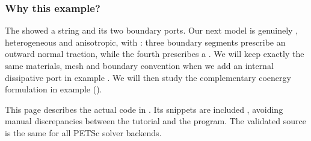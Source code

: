 \documentclass[letterpaper,10pt,english]{sphinxmanual}
\begin{document}
\subsubsection{Why this example?}
\label{\detokenize{examples/wave:why-this-example}}
\sphinxAtStartPar
The {\hyperref[\detokenize{started::doc}]{}} showed a 
string and its two boundary ports. Our next model is genuinely
, heterogeneous and anisotropic, with : three boundary segments prescribe an outward
normal traction, while the fourth prescribes a . We will
keep exactly the same materials, mesh and boundary convention when
we add an internal dissipative port in example . We will
then study the complementary co\sphinxhyphen{}energy formulation in example
 ({\hyperref[\detokenize{examples/wave_coenergy::doc}]{}}).

\sphinxAtStartPar
This page describes the actual code in .
Its snippets are included , avoiding
manual discrepancies between the tutorial and the program.
The validated source is the same for all PETSc solver backends.
\end{document}
